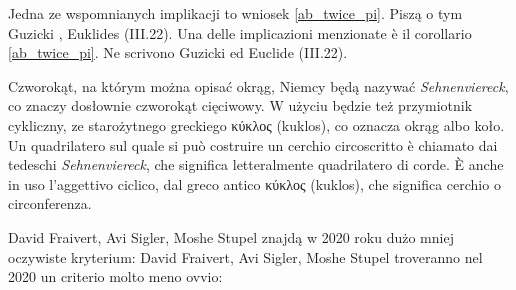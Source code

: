 Jedna ze wspomnianych implikacji to wniosek \ref{ab_twice_pi}. %
Piszą o tym Guzicki \cite[s. 11-13, 16, 17]{guzicki_2021}, Euklides (III.22). %
Una delle implicazioni menzionate è il corollario \ref{ab_twice_pi}. %
Ne scrivono Guzicki \cite[p. 11-13, 16, 17]{guzicki_2021} ed Euclide (III.22). %

Czworokąt, na którym można opisać okrąg, Niemcy będą nazywać \emph{Sehnenviereck}, co znaczy dosłownie czworokąt cięciwowy. %
W użyciu będzie też przymiotnik cykliczny, ze starożytnego greckiego κύκλος (kuklos), co oznacza okrąg albo koło. %
Un quadrilatero sul quale si può costruire un cerchio circoscritto è chiamato dai tedeschi \emph{Sehnenviereck}, che significa letteralmente quadrilatero di corde. %
È anche in uso l'aggettivo ciclico, dal greco antico κύκλος (kuklos), che significa cerchio o circonferenza. %

David Fraivert, Avi Sigler, Moshe Stupel znajdą w 2020 roku dużo mniej oczywiste kryterium: %
David Fraivert, Avi Sigler, Moshe Stupel troveranno nel 2020 un criterio molto meno ovvio: %
%
%
%

